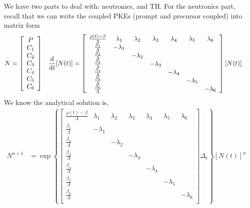 \documentclass{school-22.211-notes}
\begin{document}
\clearpage
{}
We have two parts to deal with: neutronics, and TH. For the neutronics part, recall that we can write the coupled PKEs (prompt and precursor coupled) into matrix form 
\begin{align}
N &= \left[ \begin{array}{c} P \\ C_1 \\ C_2 \\ C_3 \\ C_4 \\ C_5 \\ C_6 \end{array} \right]  
& \frac{\mathrm{d}}{\mathrm{d}t} [N(t)] &= \left[ \begin{array}{ccccccc}
\frac{\rho(t) - \beta}{\Lambda} & \lambda_1  & \lambda_2 & \lambda_3 & \lambda_4 & \lambda_5 & \lambda_6 \\ 
\frac{\beta_1}{\Lambda}         & - \lambda_1 &          &           &           &           & \\
\frac{\beta_2}{\Lambda}         &             & -\lambda_2 &         &           &           & \\
\frac{\beta_3}{\Lambda}         &             &            & -\lambda_3 &        &           & \\
\frac{\beta_4}{\Lambda}         &             &           &          & - \lambda_4 &         & \\
\frac{\beta_5}{\Lambda}         &             &           &          &           & -\lambda_5 & \\
\frac{\beta_6}{\Lambda}         &             &           &          &           &           & - \lambda_6 \\
\end{array} \right] [N(t)]
\end{align}
We know the analytical solution is, 
\begin{align}
N^{n+1}  &= \exp \left\{ \left[ \begin{array}{ccccccc}
\frac{\rho(t) - \beta}{\Lambda} & \lambda_1  & \lambda_2 & \lambda_3 & \lambda_4 & \lambda_5 & \lambda_6 \\ 
\frac{\beta_1}{\Lambda}         & - \lambda_1 &          &           &           &           & \\
\frac{\beta_2}{\Lambda}         &             & -\lambda_2 &         &           &           & \\
\frac{\beta_3}{\Lambda}         &             &            & -\lambda_3 &        &           & \\
\frac{\beta_4}{\Lambda}         &             &           &          & - \lambda_4 &         & \\
\frac{\beta_5}{\Lambda}         &             &           &          &           & -\lambda_5 & \\
\frac{\beta_6}{\Lambda}         &             &           &          &           &           & - \lambda_6 \\
\end{array} \right]  \Delta_t \right\}  [N(t)]^n  \label{n-analytical}
\end{align}
\end{document}
